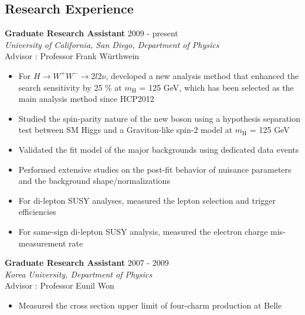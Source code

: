 \documentclass[margin]{res}
\begin{document}
\begin{resume}
\section{Research Experience}
\textbf{Graduate Research Assistant}                             \hfill 2009 - present     \\
\textit{University of California, San Diego, Department of Physics}                        \\
Advisor :  Professor Frank W\"urthwein                                                       
\begin{itemize} \itemsep -2pt  %
 \item For $H\rightarrow W^+W^-\rightarrow2l2\nu$, developed a new analysis method that 
       enhanced the search sensitivity by 25 \% at $m_{\mathrm{H}}$ = 125 GeV, 
       which has been selected as the main analysis method since HCP2012 
 \item Studied the spin-parity nature of the new boson using a hypothesis separation test 
       between SM Higgs and a Graviton-like spin-2 model at $m_{\mathrm{H}}$ = 125 GeV
 \item Validated the fit model of the major backgrounds using dedicated data events
 \item Performed extensive studies on the post-fit behavior of nuisance parameters 
       and the background shape/normalizations 
 \item For di-lepton SUSY analyses, measured the lepton selection and trigger efficiencies 
 \item For same-sign di-lepton SUSY analysis, measured the electron charge 
       mis-measurement rate 
\end{itemize}

\textbf{Graduate Research Assistant}           \hfill 2007 - 2009        \\
\textit{Korea University, Department of Physics}       \\
Advisor : Professor Eunil Won                                                                 
 \begin{itemize} \itemsep -2pt  %
 \item Measured the cross section upper limit of four-charm production at Belle   
 \end{itemize}



\end{resume}
\end{document}
